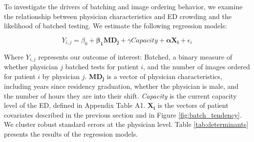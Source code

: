\documentclass[,,nonblindrev]{informs}
\begin{document}
To investigate the drivers of batching and image ordering behavior, we
examine the relationship between physician characteristics and ED
crowding and the likelihood of batched testing. We estimate the
following regression models:

\small

\begin{equation}
Y_{i,j} = \beta_0 + \mathbf{\beta_1 MD_j} + \gamma Capacity + \mathbf{\alpha X_{i}} + \epsilon_i
\end{equation}

\normalsize

Where \(Y_{i,j}\) represents our outcome of interest: Batched, a binary
measure of whether physician \(j\) batched tests for patient \(i\), and
the number of images ordered for patient \(i\) by physician \(j\).
\(\mathbf{MD_j}\) is a vector of physician characteristics, including
years since residency graduation, whether the physician is male, and the
number of hours they are into their shift. \emph{Capacity} is the
current capacity level of the ED, defined in Appendix Table A1.
\(\mathbf{X_{i}}\) is the vectors of patient covariates described in the
previous section and in Figure \ref{fig:batch_tendency}. We cluster
robust standard errors at the physician level. Table
\ref{tab:determinants} presents the results of the regression models.
\end{document}
